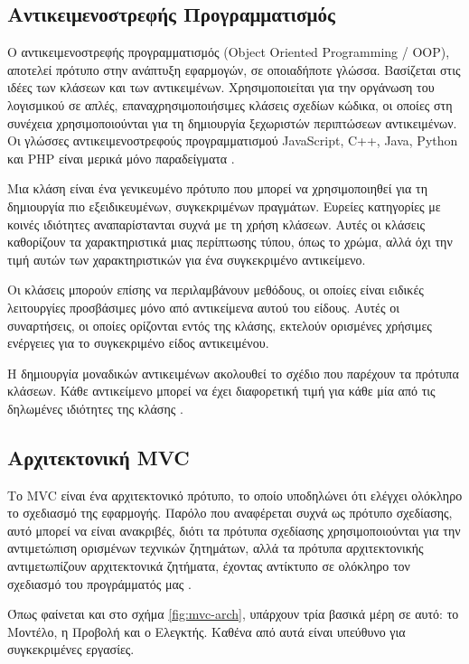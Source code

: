 \subsection{Αντικειμενοστρεφής Προγραμματισμός}
Ο αντικειμενοστρεφής προγραμματισμός (Object Oriented Programming / OOP), αποτελεί πρότυπο στην ανάπτυξη εφαρμογών, σε οποιαδήποτε γλώσσα. Βασίζεται στις ιδέες των κλάσεων και των αντικειμένων. Χρησιμοποιείται για την οργάνωση του λογισμικού σε απλές, επαναχρησιμοποιήσιμες κλάσεις σχεδίων κώδικα, οι οποίες στη συνέχεια χρησιμοποιούνται για τη δημιουργία ξεχωριστών περιπτώσεων αντικειμένων. Οι γλώσσες αντικειμενοστρεφούς προγραμματισμού JavaScript, C++, Java, Python και PHP είναι μερικά μόνο παραδείγματα \cite{smith2011object}.

Μια κλάση είναι ένα γενικευμένο πρότυπο που μπορεί να χρησιμοποιηθεί για τη δημιουργία πιο εξειδικευμένων, συγκεκριμένων πραγμάτων. Ευρείες κατηγορίες με κοινές ιδιότητες αναπαρίστανται συχνά με τη χρήση κλάσεων. Αυτές οι κλάσεις καθορίζουν τα χαρακτηριστικά μιας περίπτωσης τύπου, όπως το χρώμα, αλλά όχι την τιμή αυτών των χαρακτηριστικών για ένα συγκεκριμένο αντικείμενο.

Οι κλάσεις μπορούν επίσης να περιλαμβάνουν μεθόδους, οι οποίες είναι ειδικές λειτουργίες προσβάσιμες μόνο από αντικείμενα αυτού του είδους. Αυτές οι συναρτήσεις, οι οποίες ορίζονται εντός της κλάσης, εκτελούν ορισμένες χρήσιμες ενέργειες για το συγκεκριμένο είδος αντικειμένου.

Η δημιουργία μοναδικών αντικειμένων ακολουθεί το σχέδιο που παρέχουν τα πρότυπα κλάσεων. Κάθε αντικείμενο μπορεί να έχει διαφορετική τιμή για κάθε μία από τις δηλωμένες ιδιότητες της κλάσης \cite{Doherty_2020}.


\subsection{Αρχιτεκτονική MVC}
Το MVC είναι ένα αρχιτεκτονικό πρότυπο, το οποίο υποδηλώνει ότι ελέγχει ολόκληρο το σχεδιασμό της εφαρμογής. Παρόλο που αναφέρεται συχνά ως πρότυπο σχεδίασης, αυτό μπορεί να είναι ανακριβές, διότι τα πρότυπα σχεδίασης χρησιμοποιούνται για την αντιμετώπιση ορισμένων τεχνικών ζητημάτων, αλλά τα πρότυπα αρχιτεκτονικής αντιμετωπίζουν αρχιτεκτονικά ζητήματα, έχοντας αντίκτυπο σε ολόκληρο τον σχεδιασμό του προγράμματός μας \cite{Svirca_2020}.

Όπως φαίνεται και στο σχήμα \ref{fig:mvc-arch}, υπάρχουν τρία βασικά μέρη σε αυτό: το Μοντέλο, η Προβολή και ο Ελεγκτής. Καθένα από αυτά είναι υπεύθυνο για συγκεκριμένες εργασίες.

